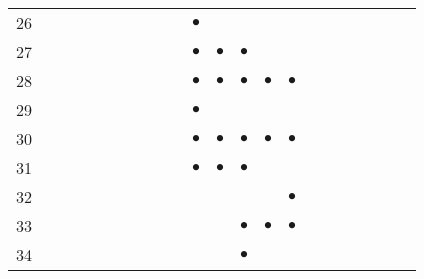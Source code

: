 \documentclass[text.tex]{subfiles}
\begin{document}
{\begin{center}
\begin{longtable}{l|ccccccccccccccccccccc}
26  &           &           &           &           &           &           &           &           &           & $\bullet$ &           &           &           &           &           &           &           &           &           &           &           \\
27  &           &           &           &           &           &           &           &           &           & $\bullet$ & $\bullet$ & $\bullet$ &           &           &           &           &           &           &           &           &           \\
28  &           &           &           &           &           &           &           &           &           & $\bullet$ & $\bullet$ & $\bullet$ & $\bullet$ & $\bullet$ &           &           &           &           &           &           &           \\
29  &           &           &           &           &           &           &           &           &           & $\bullet$ &           &           &           &           &           &           &           &           &           &           &           \\
30  &           &           &           &           &           &           &           &           &           & $\bullet$ & $\bullet$ & $\bullet$ & $\bullet$ & $\bullet$ &           &           &           &           &           &           &           \\
31  &           &           &           &           &           &           &           &           &           & $\bullet$ & $\bullet$ & $\bullet$ &           &           &           &           &           &           &           &           &           \\
32  &           &           &           &           &           &           &           &           &           &           &           &           &           & $\bullet$ &           &           &           &           &           &           &           \\
33  &           &           &           &           &           &           &           &           &           &           &           & $\bullet$ & $\bullet$ & $\bullet$ &           &           &           &           &           &           &           \\
34  &           &           &           &           &           &           &           &           &           &           &           & $\bullet$ &           &           &           &           &           &           &           &           &           \\

\end{longtable}
\end{center}}
\end{document}
